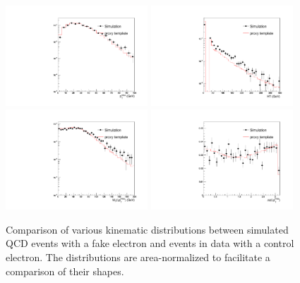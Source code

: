 \documentclass[thesis.tex]{subfiles}
\renewcommand\_{\textunderscore\allowbreak}
\begin{document}
\begin{figure}[hbtp]
    \begin{center}
    \includegraphics[width=0.475\textwidth]{Figures/faketemp_electron_met.pdf}
    \includegraphics[width=0.475\textwidth]{Figures/faketemp_electron_ht.pdf}
    \includegraphics[width=0.475\textwidth]{Figures/faketemp_electron_mt.pdf}
    \includegraphics[width=0.475\textwidth]{Figures/faketemp_electron_dPhi.pdf}
    \caption{Comparison of various kinematic distributions between simulated
        QCD events with a fake electron and events in data with a control
        electron. The distributions are area-normalized to facilitate a
        comparison of their shapes.}
        \label{fig:c_electron}
\end{center}\end{figure}
\end{document}
